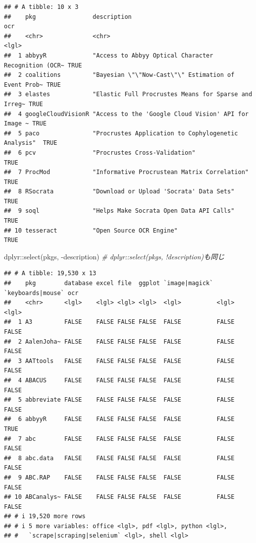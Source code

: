 \documentclass[
]{article}
\newenvironment{Shaded}{\begin{snugshade}}{\end{snugshade}}
\newcommand{\CommentTok}[1]{\textcolor[rgb]{0.56,0.35,0.01}{\textit{#1}}}
\newcommand{\FunctionTok}[1]{\textcolor[rgb]{0.00,0.00,0.00}{#1}}
\newcommand{\NormalTok}[1]{#1}
\newcommand{\SpecialCharTok}[1]{\textcolor[rgb]{0.00,0.00,0.00}{#1}}
\begin{document}
\begin{verbatim}
## # A tibble: 10 x 3
##    pkg                description                                          ocr  
##    <chr>              <chr>                                                <lgl>
##  1 abbyyR             "Access to Abbyy Optical Character Recognition (OCR~ TRUE 
##  2 coalitions         "Bayesian \"\"Now-Cast\"\" Estimation of Event Prob~ TRUE 
##  3 elastes            "Elastic Full Procrustes Means for Sparse and Irreg~ TRUE 
##  4 googleCloudVisionR "Access to the 'Google Cloud Vision' API for Image ~ TRUE 
##  5 paco               "Procrustes Application to Cophylogenetic Analysis"  TRUE 
##  6 pcv                "Procrustes Cross-Validation"                        TRUE 
##  7 ProcMod            "Informative Procrustean Matrix Correlation"         TRUE 
##  8 RSocrata           "Download or Upload 'Socrata' Data Sets"             TRUE 
##  9 soql               "Helps Make Socrata Open Data API Calls"             TRUE 
## 10 tesseract          "Open Source OCR Engine"                             TRUE
\end{verbatim}

\begin{Shaded}
\begin{Highlighting}[]
\NormalTok{dplyr}\SpecialCharTok{::}\FunctionTok{select}\NormalTok{(pkgs, }\SpecialCharTok{{-}}\NormalTok{description) }\CommentTok{\# dplyr::select(pkgs, !description)も同じ}
\end{Highlighting}
\end{Shaded}

\begin{verbatim}
## # A tibble: 19,530 x 13
##    pkg        database excel file  ggplot `image|magick` `keyboards|mouse` ocr  
##    <chr>      <lgl>    <lgl> <lgl> <lgl>  <lgl>          <lgl>             <lgl>
##  1 A3         FALSE    FALSE FALSE FALSE  FALSE          FALSE             FALSE
##  2 AalenJoha~ FALSE    FALSE FALSE FALSE  FALSE          FALSE             FALSE
##  3 AATtools   FALSE    FALSE FALSE FALSE  FALSE          FALSE             FALSE
##  4 ABACUS     FALSE    FALSE FALSE FALSE  FALSE          FALSE             FALSE
##  5 abbreviate FALSE    FALSE FALSE FALSE  FALSE          FALSE             FALSE
##  6 abbyyR     FALSE    FALSE FALSE FALSE  FALSE          FALSE             TRUE 
##  7 abc        FALSE    FALSE FALSE FALSE  FALSE          FALSE             FALSE
##  8 abc.data   FALSE    FALSE FALSE FALSE  FALSE          FALSE             FALSE
##  9 ABC.RAP    FALSE    FALSE FALSE FALSE  FALSE          FALSE             FALSE
## 10 ABCanalys~ FALSE    FALSE FALSE FALSE  FALSE          FALSE             FALSE
## # i 19,520 more rows
## # i 5 more variables: office <lgl>, pdf <lgl>, python <lgl>,
## #   `scrape|scraping|selenium` <lgl>, shell <lgl>
\end{verbatim}
\end{document}
